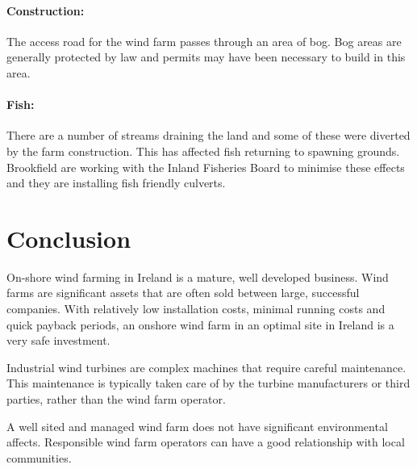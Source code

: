 \documentclass[12pt]{article} %
\begin{document}
\paragraph{Construction:} The access road for the wind farm passes through an area of bog. Bog areas are generally protected by law and permits may have been necessary to build in this area.

\paragraph{Fish:} There are a number of streams draining the land and some of these were diverted by the farm construction. This has affected fish returning to spawning grounds. Brookfield are working with the Inland Fisheries Board to minimise these effects and they are installing fish friendly culverts.


\section{Conclusion}
On-shore wind farming in Ireland is a mature, well developed business. Wind farms are significant assets that are often sold between large, successful companies. With relatively low installation costs, minimal running costs and quick payback periods, an onshore wind farm in an optimal site in Ireland is a very safe investment.

Industrial wind turbines are complex machines that require careful maintenance. This maintenance is typically taken care of by the turbine manufacturers or third parties, rather than the wind farm operator. 

A well sited and managed wind farm does not have significant environmental affects. Responsible wind farm operators can have a good relationship with local communities.

\printbibliography

\end{document}
